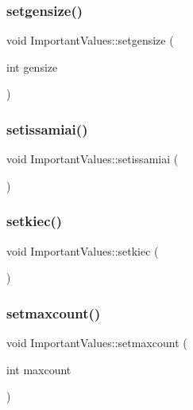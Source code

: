 \subsubsection{\texorpdfstring{setgensize()}{setgensize()}}
{\footnotesize\ttfamily void Important\+Values\+::setgensize (\begin{DoxyParamCaption}\item[{int}]{gensize }\end{DoxyParamCaption})\hspace{0.3cm}{\ttfamily [inline]}}

\mbox{\label{class_important_values_afe124ab285a17f87b0de25df6b678df8}} 
\subsubsection{\texorpdfstring{setissamiai()}{setissamiai()}}
{\footnotesize\ttfamily void Important\+Values\+::setissamiai (\begin{DoxyParamCaption}{ }\end{DoxyParamCaption})\hspace{0.3cm}{\ttfamily [inline]}}

\mbox{\label{class_important_values_ab4fa63cacb5b8c7e1aef75beb0171a5d}} 
\subsubsection{\texorpdfstring{setkiec()}{setkiec()}}
{\footnotesize\ttfamily void Important\+Values\+::setkiec (\begin{DoxyParamCaption}{ }\end{DoxyParamCaption})\hspace{0.3cm}{\ttfamily [inline]}}

\mbox{\label{class_important_values_a853329758c5544b28980c67e0ba40471}} 
\subsubsection{\texorpdfstring{setmaxcount()}{setmaxcount()}}
{\footnotesize\ttfamily void Important\+Values\+::setmaxcount (\begin{DoxyParamCaption}\item[{int}]{maxcount }\end{DoxyParamCaption})\hspace{0.3cm}{\ttfamily [inline]}}

